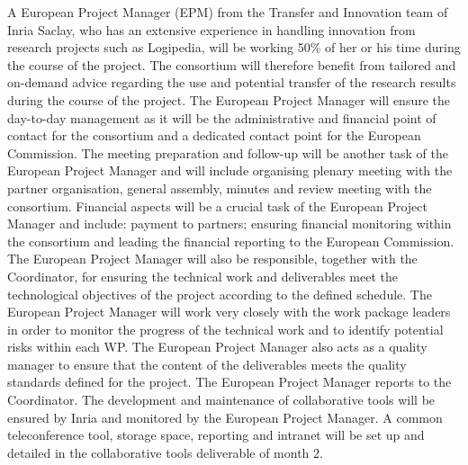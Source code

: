 \begin{workpackage}[id=management,type=MGT,wphases=1-48,
  short=Management,
  title=Management,
  lead=Inr,InrRM=34,InnRM=2,SacRM=2,TumRM=2,LieRM=2,BelRM=2,DelRM=2,FauRM=2]
\begin{tasklist}
  \begin{task}[id=admin,title=Administrative and Financial Management,shorttitle=Adm.\&Fin.,lead=Inr,InrRM=20,wphases=1-48]
    A European Project Manager (EPM) from the Transfer and Innovation
    team of Inria Saclay, who has an extensive experience in handling
    innovation from research projects such as Logipedia, will be working
    50\% of her or his time during the course of the project.
     The
    consortium will therefore benefit from tailored and on-demand
    advice regarding the use and potential transfer of the research
    results during the course of the project.  The European Project Manager will ensure the
    day-to-day management as it will be the administrative and
    financial point of contact for the consortium and a dedicated
    contact point for the European Commission. The meeting preparation
    and follow-up will be another task of the European Project Manager and will include
    organising plenary meeting with the partner organisation, general
    assembly, minutes and review meeting with the consortium. Financial
    aspects will be a crucial task of the European Project Manager and include: payment to
    partners; ensuring financial monitoring within the consortium and
    leading the financial reporting to the European Commission.  The
    European Project Manager will also be responsible, together with the 
    Coordinator, for ensuring the technical work and deliverables meet
    the technological objectives of the project according to the
    defined schedule. The European Project Manager will work very closely with the work
    package leaders in order to monitor the progress of the technical
    work and to identify potential risks within each WP. The European Project Manager also
    acts as a quality manager to ensure that the content of the
    deliverables meets the quality standards defined for the
    project. The European Project Manager reports to the Coordinator.  The
    development and maintenance of collaborative tools will be ensured
    by Inria and monitored by the European Project Manager. A common teleconference tool,
    storage space, reporting and intranet will be set up and detailed
    in the collaborative tools deliverable of month 2.
  \end{task}


\end{tasklist}
\end{workpackage}
